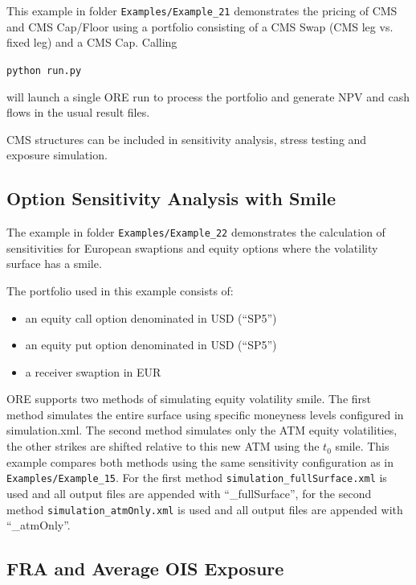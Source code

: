 \documentclass[12pt, a4paper]{article}
\begin{document}
This example in folder {\tt Examples/Example\_21} demonstrates the pricing of CMS and CMS Cap/Floor using a portfolio consisting of a CMS Swap (CMS leg vs. fixed leg) and a CMS Cap. Calling

\medskip
\centerline{\tt python run.py}

\medskip
will launch a single ORE run to process the portfolio and generate NPV and cash flows in the usual result files. 

\medskip
CMS structures can be included in sensitivity analysis, stress testing and exposure simulation. 

\subsection{Option Sensitivity Analysis with Smile}%

The example in folder {\tt Examples/Example\_22} demonstrates the calculation of sensitivities for European swaptions and equity options where the volatility surface has a smile. 

\medskip
The portfolio used in this example consists of:
\begin{itemize}
	\item an equity call option denominated in USD (``SP5'')
	\item an equity put option denominated in USD (``SP5'')
	\item a receiver swaption in EUR
\end{itemize}

\medskip
ORE supports two methods of simulating equity volatility smile. The first method simulates the entire surface using specific moneyness levels configured in simulation.xml. The second method simulates only the ATM equity volatilities, the other strikes are shifted relative to this new ATM using the $t_{0}$ smile.  This example compares both methods using the same sensitivity configuration as in {\tt Examples/Example\_15}. For the first method {\tt simulation\_fullSurface.xml} is used and all output files are appended with ``\_fullSurface'', for the second method {\tt simulation\_atmOnly.xml} is used and all output files are appended with ``\_atmOnly''.


\subsection{FRA and Average OIS Exposure}%
\end{document}
